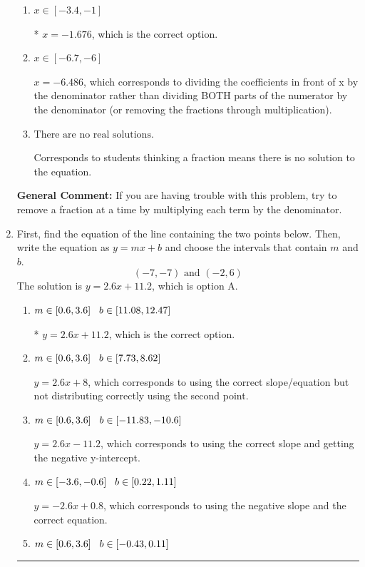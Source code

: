 \documentclass{extbook}[14pt]
\newcommand{\litem}[1]{\item #1

\rule{\textwidth}{0.4pt}}
\begin{document}
\begin{enumerate}
{\begin{enumerate}[label=\Alph*.]
 $x = -0.369$, which corresponds to dividing the second number in the numerator by the denominator rather than dividing BOTH parts of the numerator by the denominator (or removing the fractions through multiplication).
\item \( x \in [-3.4, -1] \)

* $x = -1.676$, which is the correct option.
\item \( x \in [-6.7, -6] \)

 $x = -6.486$, which corresponds to dividing the coefficients in front of x by the denominator rather than dividing BOTH parts of the numerator by the denominator (or removing the fractions through multiplication).
\item \( \text{There are no real solutions.} \)

Corresponds to students thinking a fraction means there is no solution to the equation.
\end{enumerate}

\textbf{General Comment:} If you are having trouble with this problem, try to remove a fraction at a time by multiplying each term by the denominator.
}
\litem{
First, find the equation of the line containing the two points below. Then, write the equation as $ y=mx+b $ and choose the intervals that contain $m$ and $b$.
\[ (-7, -7) \text{ and } (-2, 6) \]The solution is \( y = 2.6x + 11.2 \), which is option A.\begin{enumerate}[label=\Alph*.]
\item \( m \in [0.6, 3.6] \hspace*{3mm} b \in [11.08, 12.47] \)

* $y = 2.6x + 11.2$, which is the correct option.
\item \( m \in [0.6, 3.6] \hspace*{3mm} b \in [7.73, 8.62] \)

 $y = 2.6x + 8$, which corresponds to using the correct slope/equation but not distributing correctly using the second point.
\item \( m \in [0.6, 3.6] \hspace*{3mm} b \in [-11.83, -10.6] \)

 $y = 2.6x -11.2$, which corresponds to using the correct slope and getting the negative y-intercept.
\item \( m \in [-3.6, -0.6] \hspace*{3mm} b \in [0.22, 1.11] \)

 $y = -2.6x + 0.8$, which corresponds to using the negative slope and the correct equation.
\item \( m \in [0.6, 3.6] \hspace*{3mm} b \in [-0.43, 0.11] \)


\end{enumerate}}
\end{enumerate}
\end{document}
